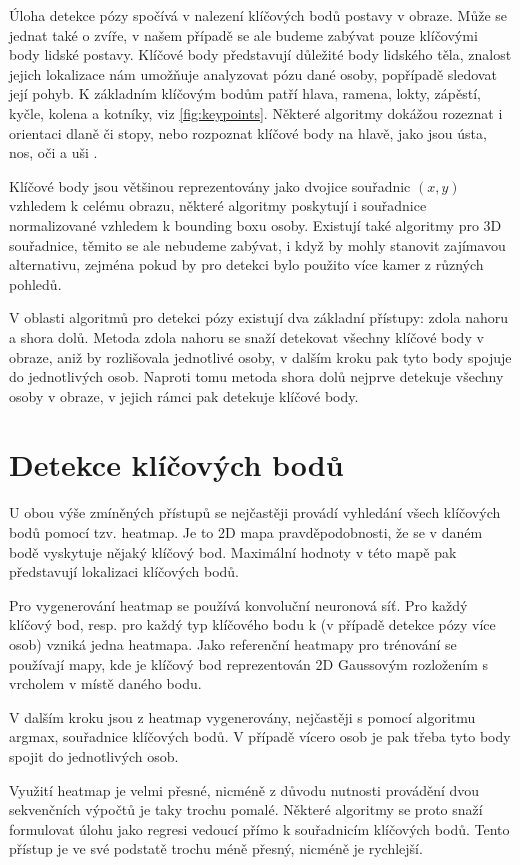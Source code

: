 Úloha detekce pózy spočívá v nalezení klíčových bodů postavy v obraze. Může se
jednat také o zvíře, v našem případě se ale budeme zabývat pouze klíčovými body
lidské postavy. Klíčové body představují důležité body lidského těla, znalost
jejich lokalizace nám umožňuje analyzovat pózu dané osoby, popřípadě sledovat
její pohyb. K základním klíčovým bodům patří hlava, ramena, lokty, zápěstí,
kyčle, kolena a kotníky, viz \ref{fig:keypoints}. Některé algoritmy dokážou
rozeznat i orientaci dlaně či stopy, nebo rozpoznat klíčové body na hlavě, jako
jsou ústa, nos, oči a uši \cite{blazepose}.

Klíčové body jsou většinou reprezentovány jako dvojice souřadnic $(x, y)$
vzhledem k celému obrazu, některé algoritmy poskytují i souřadnice
normalizované vzhledem k bounding boxu osoby. Existují také algoritmy pro 3D
souřadnice, těmito se ale nebudeme zabývat, i když by mohly stanovit zajímavou
alternativu, zejména pokud by pro detekci bylo použito více kamer z různých
pohledů.

V oblasti algoritmů pro detekci pózy existují dva základní přístupy: zdola
nahoru a shora dolů. Metoda zdola nahoru se snaží detekovat všechny klíčové
body v obraze, aniž by rozlišovala jednotlivé osoby, v dalším kroku pak tyto
body spojuje do jednotlivých osob. Naproti tomu metoda shora dolů nejprve
detekuje všechny osoby v obraze, v jejich rámci pak detekuje klíčové body.

\section{Detekce klíčových bodů}

U obou výše zmíněných přístupů se nejčastěji provádí vyhledání všech klíčových
bodů pomocí tzv. heatmap. Je to 2D mapa pravděpodobnosti, že se v daném bodě
vyskytuje nějaký klíčový bod. Maximální hodnoty v této mapě pak představují
lokalizaci klíčových bodů.

Pro vygenerování heatmap se používá konvoluční neuronová síť. Pro každý klíčový
bod, resp. pro každý typ klíčového bodu k (v případě detekce pózy více osob)
vzniká jedna heatmapa. Jako referenční heatmapy pro trénování se používají
mapy, kde je klíčový bod reprezentován 2D Gaussovým rozložením s vrcholem v
místě daného bodu.

V dalším kroku jsou z heatmap vygenerovány, nejčastěji s pomocí algoritmu
argmax, souřadnice klíčových bodů. V případě vícero osob je pak třeba tyto body
spojit do jednotlivých osob.

Využití heatmap je velmi přesné, nicméně z důvodu nutnosti provádění dvou
sekvenčních výpočtů je taky trochu pomalé. Některé algoritmy se proto snaží
formulovat úlohu jako regresi vedoucí přímo k souřadnicím klíčových bodů. Tento
přístup je ve své podstatě trochu méně přesný, nicméně je rychlejší.

